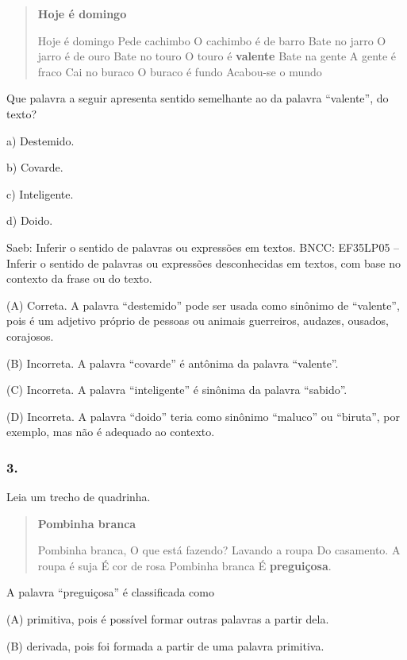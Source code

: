 \begin{quote}
\textbf{Hoje é domingo}

Hoje é domingo
Pede cachimbo
O cachimbo é de barro
Bate no jarro
O jarro é de ouro
Bate no touro
O touro é \textbf{valente}
Bate na gente
A gente é fraco
Cai no buraco
O buraco é fundo
Acabou-se o mundo

\end{quote}

Que palavra a seguir apresenta sentido semelhante ao da palavra
``valente'', do texto?

a) Destemido.

b) Covarde.

c) Inteligente.

d) Doido.

Saeb: Inferir o sentido de palavras ou expressões em textos.
BNCC: EF35LP05 -- Inferir o sentido de palavras ou expressões
desconhecidas em textos, com base no contexto da frase ou do texto.

(A) Correta. A palavra ``destemido'' pode ser usada como sinônimo de
``valente'', pois é um adjetivo próprio de pessoas ou animais
guerreiros, audazes, ousados, corajosos.

(B) Incorreta. A palavra ``covarde'' é antônima da palavra ``valente''.

(C) Incorreta. A palavra ``inteligente'' é sinônima da palavra
``sabido''.

(D) Incorreta. A palavra ``doido'' teria como sinônimo ``maluco'' ou
``biruta'', por exemplo, mas não é adequado ao contexto.

\subsubsection{3. }\label{section-15}

Leia um trecho de quadrinha.

\begin{quote}
\textbf{Pombinha branca}

Pombinha branca,
O que está fazendo?
Lavando a roupa
Do casamento.
A roupa é suja
É cor de rosa
Pombinha branca
É \textbf{preguiçosa}.

\end{quote}

A palavra ``preguiçosa'' é classificada como

(A) primitiva, pois é possível formar outras palavras a partir dela.

(B) derivada, pois foi formada a partir de uma palavra primitiva.

